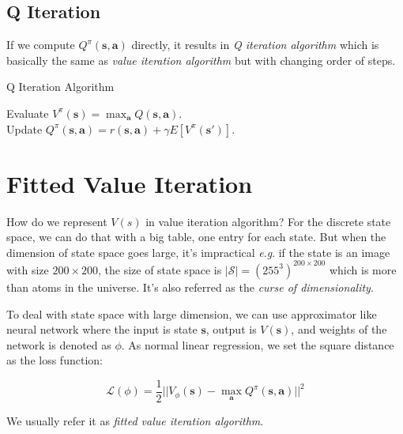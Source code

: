 \documentclass{tufte-handout}
\newcommand{\eg}{\textit{e}.\textit{g}. }
\newcommand{\s}{\mathbf{s}}
\newcommand{\act}{\mathbf{a}}
\begin{document}
\subsection{Q Iteration}

If we compute $Q^\pi (\s, \act)$ directly, it results in \emph{Q iteration algorithm} which is basically the same as \emph{value iteration algorithm} but with changing order of steps.

\begin{algorithm}
  \caption{Q Iteration Algorithm}
    \label{algo:q-iter}
    \begin{algorithmic}[1]
    \STATE Evaluate $ V^\pi (\s) = \max_\act Q(\s, \act)$. \\
    \STATE Update $Q^\pi (\s, \act) = r(\s, \act) +\gamma E[V^\pi(\s')]$. \\
    \ENDWHILE
  \end{algorithmic}
\end{algorithm}

\section{Fitted Value Iteration}

How do we represent $V(s)$ in value iteration algorithm? For the discrete state space, we can do that with a big table, one entry for each state. But when the dimension of state space goes large, it's impractical \eg if the state is an image with size $200 \times 200$, the size of state space is
$ |\mathcal{S}| = (255^3)^ {200 \times 200}$ which is more than atoms in the universe. It's also referred as the \emph{curse of dimensionality}.

To deal with state space with large dimension, we can use approximator like neural network where the input is state $\s$, output is $V(\s)$, and weights of the network is denoted as $\phi$. As normal linear regression, we set the square distance as the loss function:

\begin{equation}
\label{eq:9}
\mathcal{L} (\phi) = \frac{1}{2} \bigg| \bigg| V_\phi (\s) - \max_\act Q^\pi(\s, \act) \bigg|\bigg| ^ 2
\end{equation}

We usually refer it as \emph{fitted value iteration algorithm}.
\end{document}
